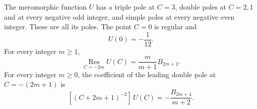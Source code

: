 \begin{proposition}
\label{mxex:poles}
The meromorphic function $U$ has a triple pole at $C=3$, double poles
at $C=2,1$ and at every negative odd integer, and simple poles at
every negative even integer.  These are all its poles.  The point
$C=0$ is regular and
\begin{equation}\label{mxex:zero-value}
 U(0)=-\frac1{12}.
\end{equation}
For every integer $m\geq1$,
\begin{equation}\label{mxex:even-residue}
 \operatorname*{Res}_{C=-2m}U(C)
       =\frac{m}{m+1}B_{2m+2}.
\end{equation}
For every integer $m\geq0$, the coefficient of the leading double
pole at $C=-(2m+1)$ is
\begin{equation}\label{mxex:odd-leading}
 [(C+2m+1)^{-2}]\,U(C)
       =-\frac{B_{2m+4}}{m+2}.
\end{equation}
\end{proposition}

